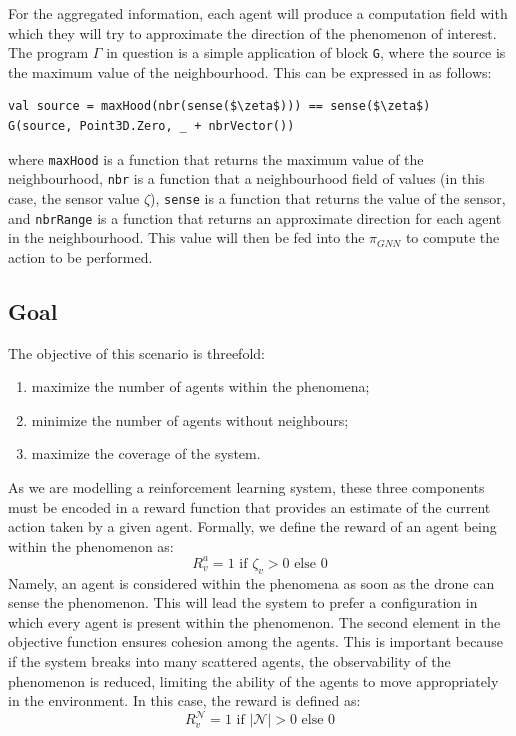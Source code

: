 For the aggregated information, each agent will produce a computation field with which they will try to approximate the direction of the phenomenon of interest. 
%
%
The program $\Gamma$ in question is a simple application of block \lstinline|G|, where the source is the maximum value of the neighbourhood. 
This can be expressed in \scafi{} as follows:
\begin{lstlisting}[mathescape=true]
val source = maxHood(nbr(sense($\zeta$))) == sense($\zeta$)
G(source, Point3D.Zero, _ + nbrVector())
\end{lstlisting}
where \texttt{maxHood} is a function that returns the maximum value of the neighbourhood, 
 \texttt{nbr} is a function that a neighbourhood field of values (in this case, the sensor value $\zeta$),
\texttt{sense} is a function that returns the value of the sensor, and
\texttt{nbrRange} is a function that returns an approximate direction for each agent in the neighbourhood.
%
This value will then be fed into the $\pi_{GNN}$ to compute the action to be performed.

 
\subsection{Goal}
 The objective of this scenario is threefold:
\begin{enumerate}
\item maximize the number of agents within the phenomena;
\item minimize the number of agents without neighbours;
\item maximize the coverage of the system.
\end{enumerate}
 
As we are modelling a reinforcement learning system, 
 these three components must be encoded in a reward function 
 that provides an estimate of the current action taken by a given agent.
% 
Formally, we define the reward of an agent being within the phenomenon as:
\begin{equation}
R^a_{v} = 1 \text{ if } \zeta_v > 0 \text{ else } 0  
\end{equation}
Namely, an agent is considered within the phenomena as soon as the drone can sense the phenomenon.
%
This will lead the system to prefer a configuration in which every agent is present within the phenomenon.
%
The second element in the objective function ensures cohesion among the agents. 
 This is important because if the system breaks into many scattered agents, 
 the observability of the phenomenon is reduced, 
 limiting the ability of the agents to move appropriately in the environment.
 In this case, the reward is defined as:
\begin{equation*}
R^{\mathcal{N}}_{v} = 1 \text{ if } |\mathcal{N}| > 0 \text{ else } 0
\end{equation*}

